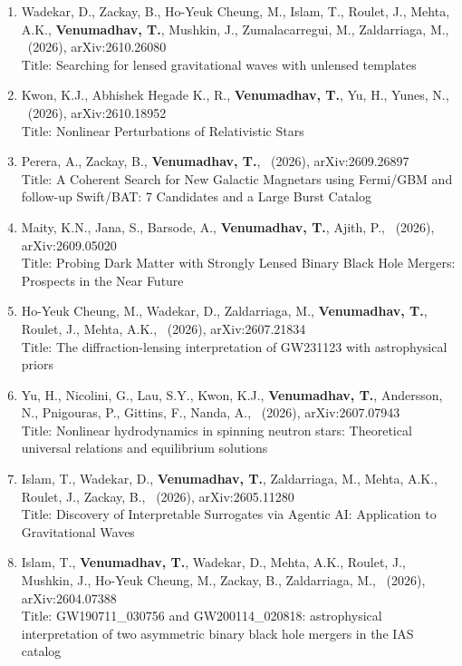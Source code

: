 \documentclass{article}
\newlength{\cvindent}
\newcommand{\cvsectionstart}{\vspace{6pt}}
\newenvironment{cvlist}{%
  \begin{list}{}{%
    \setlength{\leftmargin}{\cvindent}%
    \setlength{\rightmargin}{0pt}%
    \setlength{\topsep}{0pt}%
    \setlength{\partopsep}{0pt}%
    \setlength{\parsep}{0pt}%
    \setlength{\itemsep}{0pt}%
  }%
  \item\relax
}{%
  \end{list}
}
\begin{document}
\begin{cvlist}
\cvsectionstart
\begin{enumerate}[leftmargin=*,itemsep=0.32em,topsep=0.3em]
\item Wadekar, D., Zackay, B., Ho-Yeuk Cheung, M., Islam, T., Roulet, J., Mehta, A.K., \textbf{Venumadhav, T.}, Mushkin, J., Zumalacarregui, M., Zaldarriaga, M., \ (2026), arXiv:2610.26080 \\
Title: Searching for lensed gravitational waves with unlensed templates
\item Kwon, K.J., Abhishek Hegade K., R., \textbf{Venumadhav, T.}, Yu, H., Yunes, N., \ (2026), arXiv:2610.18952 \\
Title: Nonlinear Perturbations of Relativistic Stars
\item Perera, A., Zackay, B., \textbf{Venumadhav, T.}, \ (2026), arXiv:2609.26897 \\
Title: A Coherent Search for New Galactic Magnetars using Fermi/GBM and follow-up Swift/BAT: 7 Candidates and a Large Burst Catalog
\item Maity, K.N., Jana, S., Barsode, A., \textbf{Venumadhav, T.}, Ajith, P., \ (2026), arXiv:2609.05020 \\
Title: Probing Dark Matter with Strongly Lensed Binary Black Hole Mergers: Prospects in the Near Future
\item Ho-Yeuk Cheung, M., Wadekar, D., Zaldarriaga, M., \textbf{Venumadhav, T.}, Roulet, J., Mehta, A.K., \ (2026), arXiv:2607.21834 \\
Title: The diffraction-lensing interpretation of GW231123 with astrophysical priors
\item Yu, H., Nicolini, G., Lau, S.Y., Kwon, K.J., \textbf{Venumadhav, T.}, Andersson, N., Pnigouras, P., Gittins, F., Nanda, A., \ (2026), arXiv:2607.07943 \\
Title: Nonlinear hydrodynamics in spinning neutron stars: Theoretical universal relations and equilibrium solutions
\item Islam, T., Wadekar, D., \textbf{Venumadhav, T.}, Zaldarriaga, M., Mehta, A.K., Roulet, J., Zackay, B., \ (2026), arXiv:2605.11280 \\
Title: Discovery of Interpretable Surrogates via Agentic AI: Application to Gravitational Waves
\item Islam, T., \textbf{Venumadhav, T.}, Wadekar, D., Mehta, A.K., Roulet, J., Mushkin, J., Ho-Yeuk Cheung, M., Zackay, B., Zaldarriaga, M., \ (2026), arXiv:2604.07388 \\
Title: GW190711\_030756 and GW200114\_020818: astrophysical interpretation of two asymmetric binary black hole mergers in the IAS catalog

\end{enumerate}
\end{cvlist}
\end{document}
